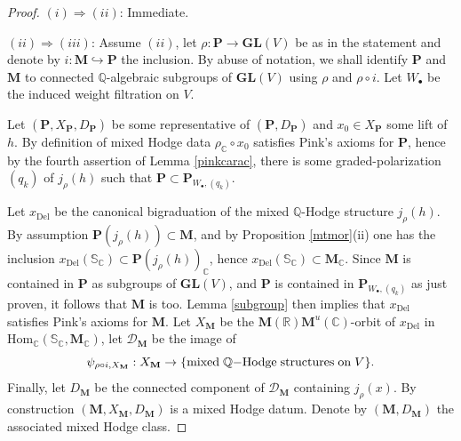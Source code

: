 \documentclass[10pt]{article}
\numberwithin{equation}{subsection}
\theoremstyle{plain}
\theoremstyle{definition}
\theoremstyle{remark}
\newcommand{\Q}{\mathbb Q}
\newcommand{\C}{\mathbb C}
\newcommand{\R}{\mathbb R}
\newcommand{\s}{\mathbb S}
\newcommand{\pp}{\mathbf P}
\newcommand{\M}{\mathbf M}
\newcommand{\bul}{\bullet}
\newcommand{\Hom}{\mathrm{Hom}}
\newcommand{\gl}{\mathbf{GL}}
\newcommand{\Del}{\mathrm{Del}}
\newcommand{\ppol}{\pp_{W_\bul, (q_k)}}
\begin{document}
\begin{proof}
$(i) \Rightarrow (ii)$: Immediate. 

$(ii) \Rightarrow (iii)$: Assume $(ii)$, let $\rho : \pp \rightarrow \gl(V)$ be as in the statement and denote by $i : \M \hookrightarrow \pp$ the inclusion. By abuse of notation, we shall identify $\pp$ and $\M$ to connected $\Q$-algebraic subgroups of $\gl(V)$ using $\rho$ and $\rho \circ i$. Let $W_\bul$ be the induced weight filtration on $V$. 

Let $(\pp, X_\pp, D_\pp)$ be some representative of $(\pp, D_\pp)$ and $x_0 \in X_\pp$ some lift of $h$. By definition of mixed Hodge data $\rho_\C \circ x_0$ satisfies Pink's axioms for $\pp$, hence by the fourth assertion of Lemma \ref{pinkcarac}, there is some graded-polarization $(q_k)$ of $j_\rho(h)$ such that $\pp \subset \ppol$.

Let $x_\Del$ be the canonical bigraduation of the mixed $\Q$-Hodge structure $j_\rho(h)$. By assumption $\pp(j_\rho(h)) \subset \M$, and by Proposition \ref{mtmor}(ii) one has the inclusion $x_\Del(\s_\C) \subset \pp(j_\rho(h))_\C$, hence $x_\Del(\s_\C) \subset \M_\C$. Since $\M$ is contained in $\pp$ as subgroups of $\gl(V)$, and $\pp$ is contained in $\ppol$ as just proven, it follows that $\M$ is too. Lemma \ref{subgroup} then implies that $x_\Del$ satisfies Pink's axioms for $\M$. Let $X_\M$ be the $\M(\R)\M^u(\C)$-orbit of $x_\Del$ in $\Hom_\C(\s_\C, \M_\C)$, let $\mathcal{D}_\M$ be the image of 
\[
\psi_{\rho \circ i, X_\M} : X_\M \rightarrow  \{\mathrm{mixed} \hspace{0.1cm} \Q\mathrm{-Hodge} \hspace{0.1cm} \mathrm{structures} \hspace{0.1cm} \mathrm{on} \hspace{0.1cm} V\}.
\] 
Finally, let $D_\M$ be the connected component of $\mathcal{D}_\M$ containing $j_\rho(x)$. By construction $(\M,X_\M, D_\M)$ is a mixed Hodge datum. Denote by $(\M,D_\M)$ the associated mixed Hodge class. 


\end{proof}
\end{document}
